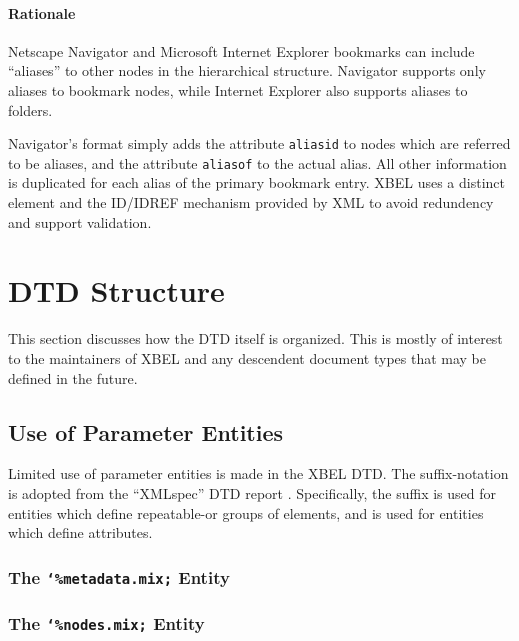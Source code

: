 \documentclass{howto}
\newcommand{\attribute}[1]{\texttt{#1}}
\newcommand{\paramentity}[1]{\texttt{\char`\%#1;}}
\begin{document}
      \paragraph*{Rationale}
        Netscape Navigator and Microsoft Internet Explorer bookmarks
        can include ``aliases'' to other nodes in the hierarchical
        structure.  Navigator supports only aliases to bookmark nodes,
        while Internet Explorer also supports aliases to folders.

        Navigator's format simply adds the attribute
        \attribute{aliasid} to nodes which are referred to be aliases,
        and the attribute \attribute{aliasof} to the actual alias.
        All other information is duplicated for each alias of the
        primary bookmark entry.  XBEL uses a distinct element and the
        ID/IDREF mechanism provided by XML to avoid redundency and
        support validation.


\section{DTD Structure
         \label{dtd-structure}}

  This section discusses how the DTD itself is organized.  This is
  mostly of interest to the maintainers of XBEL and any descendent
  document types that may be defined in the future.

  \subsection{Use of Parameter Entities
              \label{parameter-entities}}

    Limited use of parameter entities is made in the XBEL DTD.  The
    suffix-notation is adopted from the ``XMLspec'' DTD report
    \cite{w3c-xmlspec}.  Specifically, the  suffix is used
    for entities which define repeatable-or groups of elements, and
     is used for entities which define attributes.

    \subsubsection{The \paramentity{metadata.mix} Entity
                   \label{entity-metadata.mix}}

      

    \subsubsection{The \paramentity{nodes.mix} Entity
                   \label{entity-nodes.mix}}
\end{document}
